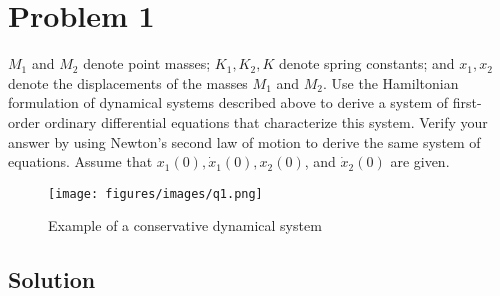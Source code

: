 \section*{Problem 1}

\(M_1\) and \(M_2\) denote point masses; \(K_1, K_2, K\) denote spring constants; and \(x_1,x_2\) denote the displacements of the masses \(M_1\) and \(M_2\).
Use the Hamiltonian formulation of dynamical systems described above to derive a system of first-order ordinary differential equations that characterize this system.
Verify your answer by using Newton's second law of motion to derive the same system of equations.
Assume that \(x_1(0), \dot x_1(0), x_2(0)\), and \(\dot x_2(0)\) are given.

\begin{figure}[h]
    \centering
    \texttt{[image: figures/images/q1.png]}
    \caption{
        Example of a conservative dynamical system
    }\label{fig:q1}
\end{figure}

\subsection*{Solution}
